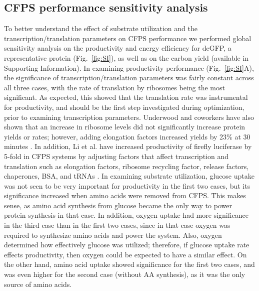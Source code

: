 \documentclass[journal=asbcd6,manuscript=article]{achemso}
\begin{document}
\subsection{CFPS performance sensitivity analysis}
To better understand the effect of substrate utilization and the transcription/translation parameters on CFPS performance we performed global sensitivity analysis on the productivity and energy efficiency for deGFP, a representative protein (Fig.~\ref{fig:SI}), as well as on the carbon yield (available in Supporting Information).
In examining productivity performance (Fig.~\ref{fig:SI}A), the significance of transcription/translation parameters was fairly constant across all three cases, with the rate of translation by ribosomes being the most significant.
As expected, this showed that the translation rate was instrumental for productivity, and should be the first step investigated during optimization, prior to examining transcription parameters.
Underwood and coworkers have also shown that an increase in ribosome levels did not significantly increase protein yields or rates; however, adding elongation factors increased yields by 23\% at 30 minutes \cite{2005_underwood_biotech}.
In addition, Li et al. have increased productivity of firefly luciferase by 5-fold in CFPS systems by adjusting factors that affect transcription and translation such as elongation factors, ribosome recycling factor, release factors, chaperones, BSA, and tRNAs \cite{2014_li_PlosOne}.
In examining substrate utilization, glucose uptake was not seen to be very important for productivity in the first two cases, but its significance increased when amino acids were removed from CFPS.
This makes sense, as amino acid synthesis from glucose became the only way to power protein synthesis in that case.
In addition, oxygen uptake had more significance in the third case than in the first two cases, since in that case oxygen was required to synthesize amino acids and power the system.
Also, oxygen determined how effectively glucose was utilized; therefore, if glucose uptake rate effects productivity, then oxygen could be expected to have a similar effect.
On the other hand, amino acid uptake showed significance for the first two cases, and was even higher for the second case (without AA synthesis), as it was the only source of amino acids.
\end{document}
